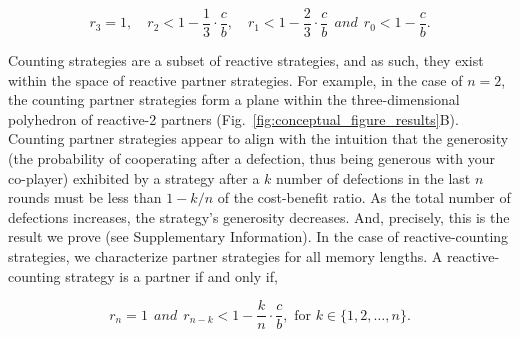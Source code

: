 \documentclass{article}
\theoremstyle{definition}
\begin{document}
\begin{equation}\label{eq:counting_three_bit_conditions}
  r_3 = 1, \quad \displaystyle r_2 < 1- \frac{1}{3} \cdot \frac{c}{b}, \quad r_1 < 1- \frac{2}{3} \cdot \frac{c}{b} ~~and~~ r_0 < 1\!-\! \frac{c}{b}.
\end{equation}

Counting strategies are a subset of reactive strategies, and as such, they exist
within the space of reactive partner strategies. For example, in the case of
$n=2$, the counting partner strategies form a plane within the three-dimensional
polyhedron of reactive-2 partners (Fig.~\ref{fig:conceptual_figure_results}B).
Counting partner strategies appear to align with the intuition that the
generosity (the probability of cooperating after a defection, thus being
generous with your co-player) exhibited by a strategy after a $k$ number of
defections in the last $n$ rounds must be less than $1 - k/n$ of the
cost-benefit ratio. As the total number of defections increases, the strategy's
generosity decreases. And, precisely, this is the result we prove (see
Supplementary Information). In the case of reactive-counting strategies, we
characterize partner strategies for all memory lengths. A reactive-counting
strategy is a partner if and only if,

\begin{equation}
  r_n = 1 ~~and~~ r_{n - k} < 1 - \frac{k}{n} \cdot \frac{c}{b}, \text{ for } k \in \{1, 2, \dots, n\}.
\end{equation}
\end{document}
